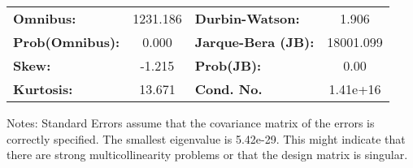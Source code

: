 \begin{center}
\begin{tabular}{lcccccc}
\bottomrule
\end{tabular}
\begin{tabular}{lclc}
\textbf{Omnibus:}       & 1231.186 & \textbf{  Durbin-Watson:     } &     1.906  \\
\textbf{Prob(Omnibus):} &   0.000  & \textbf{  Jarque-Bera (JB):  } & 18001.099  \\
\textbf{Skew:}          &  -1.215  & \textbf{  Prob(JB):          } &      0.00  \\
\textbf{Kurtosis:}      &  13.671  & \textbf{  Cond. No.          } &  1.41e+16  \\
\bottomrule
\end{tabular}
\end{center}

Notes: \newline
 [1] Standard Errors assume that the covariance matrix of the errors is correctly specified. \newline
 [2] The smallest eigenvalue is 5.42e-29. This might indicate that there are \newline
 strong multicollinearity problems or that the design matrix is singular.